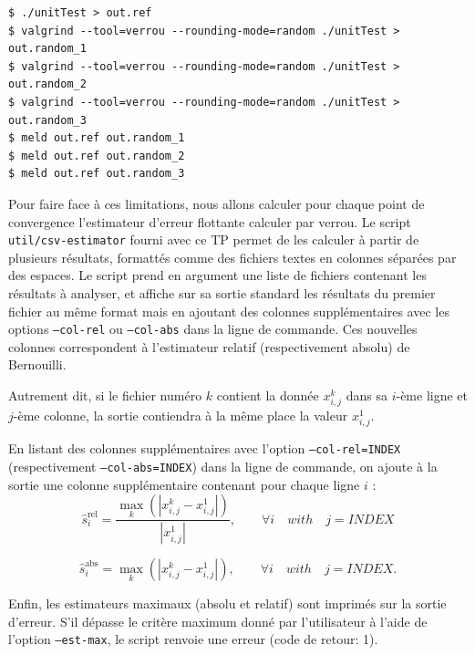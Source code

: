 \documentclass[a4paper]{article}
\newenvironment{commandline}{
  \begin{mdframed}[style=commandline]
}{
  \end{mdframed}
}
\begin{document}
\begin{commandline}
\begin{verbatim}
$ ./unitTest > out.ref 
$ valgrind --tool=verrou --rounding-mode=random ./unitTest > out.random_1
$ valgrind --tool=verrou --rounding-mode=random ./unitTest > out.random_2
$ valgrind --tool=verrou --rounding-mode=random ./unitTest > out.random_3
$ meld out.ref out.random_1
$ meld out.ref out.random_2
$ meld out.ref out.random_3
\end{verbatim}
\end{commandline}


Pour faire face à ces limitations, nous allons calculer pour chaque
point de convergence l'estimateur d'erreur flottante calculer par verrou. 
Le script \texttt{util/csv-estimator} fourni avec ce TP permet de les
calculer à partir de plusieurs
résultats, formattés comme des fichiers textes en colonnes séparées par des
espaces. Le script prend en argument une liste de fichiers contenant les
résultats à analyser, et affiche sur sa sortie standard les résultats du premier fichier au même
format mais en ajoutant des colonnes supplémentaires avec les options \texttt{--col-rel} ou \texttt{--col-abs} dans la
ligne de commande. Ces nouvelles colonnes correspondent à l'estimateur relatif (respectivement absolu) de Bernouilli.

Autrement dit, si le fichier numéro $k$ contient la donnée $x_{i,j}^k$ dans sa
$i$-ème ligne et $j$-ème colonne, la sortie contiendra à la même place la valeur
$x_{i,j}^1$.

En listant des colonnes supplémentaires avec l'option
\texttt{--col-rel=INDEX} (respectivement \texttt{--col-abs=INDEX}) dans la
ligne de commande, on ajoute à la sortie une colonne supplémentaire
contenant pour chaque ligne $i$ :
\begin{equation*}
  \hat{s}^{\text{rel}}_{i} = \frac{\max_k ( \left|x_{i,j}^k
    -x_{i,j}^1\right|) }{\left| x_{i,j}^1 \right|}, \qquad \forall i
  \quad with \quad j=INDEX
\end{equation*}

\begin{equation*}
  \hat{s}^{\text{abs}}_{i} = \max_k ( \left|x_{i,j}^k
  -x_{i,j}^1\right| ) , \qquad \forall i   \quad with \quad j=INDEX.
\end{equation*}


Enfin, les estimateurs maximaux (absolu et relatif) sont  imprimés sur la sortie d'erreur. S'il
dépasse le critère maximum donné par l'utilisateur à l'aide de l'option
\texttt{--est-max}, le script renvoie une erreur (code de retour: 1).
\end{document}
